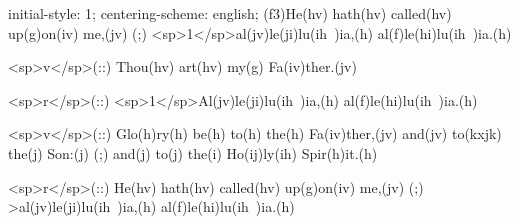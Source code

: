 initial-style: 1;
centering-scheme: english;
(f3)He(hv) hath(hv) called(hv) up(g)on(iv) me,(jv) (;) <sp>1</sp>al(jv)le(ji)lu(ih~)ia,(h) al(f)le(hi)lu(ih~)ia.(h)

<sp>v</sp>(::) Thou(hv) art(hv) my(g) Fa(iv)ther.(jv)

<sp>r</sp>(::) <sp>1</sp>Al(jv)le(ji)lu(ih~)ia,(h) al(f)le(hi)lu(ih~)ia.(h)

<sp>v</sp>(::) Glo(h)ry(h) be(h) to(h) the(h) Fa(iv)ther,(jv) and(jv) to(kxjk) the(j) Son:(j) (;) and(j) to(j) the(i) Ho(ij)ly(ih) Spir(h)it.(h)

<sp>r</sp>(::) He(hv) hath(hv) called(hv) up(g)on(iv) me,(jv) (;) >al(jv)le(ji)lu(ih~)ia,(h) al(f)le(hi)lu(ih~)ia.(h)